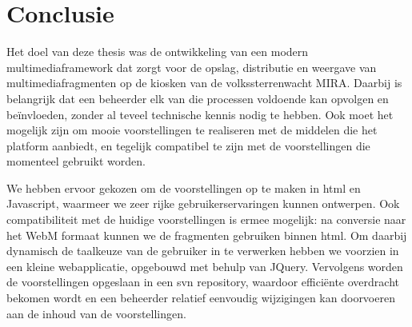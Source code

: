 %
%


\chapter{Conclusie}


Het doel van deze thesis was de ontwikkeling van een modern multimediaframework dat zorgt voor de opslag, distributie en weergave van multimediafragmenten op de kiosken van de volkssterrenwacht MIRA. Daarbij is belangrijk dat een beheerder elk van die processen voldoende kan opvolgen en beïnvloeden, zonder al teveel technische kennis nodig te hebben. Ook moet het mogelijk zijn om mooie voorstellingen te realiseren met de middelen die het platform aanbiedt, en tegelijk compatibel te zijn met de voorstellingen die momenteel gebruikt worden.

We hebben ervoor gekozen om de voorstellingen op te maken in \ac{html} en Javascript, waarmeer we zeer rijke gebruikerservaringen kunnen ontwerpen. Ook compatibiliteit met de huidige voorstellingen is ermee mogelijk: na conversie naar het WebM formaat kunnen we de fragmenten gebruiken binnen \ac{html}. Om daarbij dynamisch de taalkeuze van de gebruiker in te verwerken hebben we voorzien in een kleine webapplicatie, opgebouwd met behulp van JQuery.
Vervolgens worden de voorstellingen opgeslaan in een \ac{svn} repository, waardoor efficiënte overdracht bekomen wordt en een beheerder relatief eenvoudig wijzigingen kan doorvoeren aan de inhoud van de voorstellingen.








%
%

\listoffigures

\clearpage


%
%

\renewcommand{\lstlistlistingname}{Lijst van fragmenten}
\renewcommand{\lstlistingname}{Fragment}
\lstlistoflistings

\clearpage


%
%



